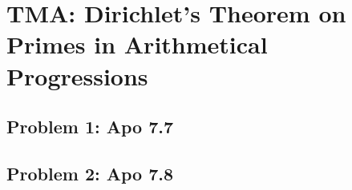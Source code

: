 \section{TMA: Dirichlet's Theorem on Primes in Arithmetical Progressions}

\subsection[Problem 1]{Problem 1: Apo 7.7}

\subsection[Problem 2]{Problem 2: Apo 7.8}
